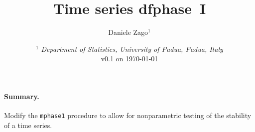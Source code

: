 \documentclass{article}
\author{Daniele Zago$^1$}
\title{Time series dfphase~I}
\date{%
\smaller
$^1$ \textit{Department of Statistics, University of Padua, Padua, Italy}\\%
v0.1 on \today}
\begin{document}
\maketitle

\paragraph{Summary.} Modify the \texttt{mphase1} procedure to allow for nonparametric testing of the stability of a time series.


\printbibliography
\end{document}
